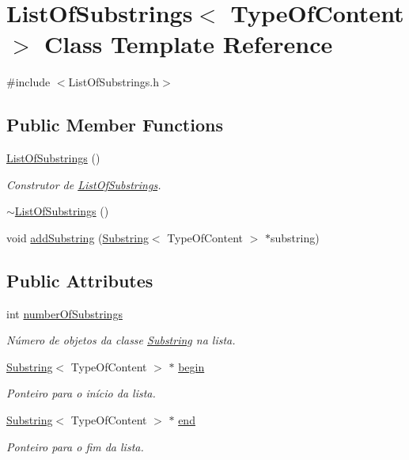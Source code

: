 \hypertarget{classListOfSubstrings}{\section{List\+Of\+Substrings$<$ Type\+Of\+Content $>$ Class Template Reference}
\label{classListOfSubstrings}
}


{\ttfamily \#include $<$List\+Of\+Substrings.\+h$>$}

\subsection*{Public Member Functions}
\begin{DoxyCompactItemize}
\item 
\hyperlink{classListOfSubstrings_ab8280100b0f6224eb4d36fc448d8eeb8}{List\+Of\+Substrings} ()
\begin{DoxyCompactList}\small\item\em Construtor de \hyperlink{classListOfSubstrings}{List\+Of\+Substrings}. \end{DoxyCompactList}\item 
\hyperlink{classListOfSubstrings_ae5aa0c336f8f5fab58a8d239cc5ab9d9}{$\sim$\+List\+Of\+Substrings} ()
\item 
void \hyperlink{classListOfSubstrings_a480372956993999a6e42e104cf264e32}{add\+Substring} (\hyperlink{classSubstring}{Substring}$<$ Type\+Of\+Content $>$ $\ast$substring)
\end{DoxyCompactItemize}
\subsection*{Public Attributes}
\begin{DoxyCompactItemize}
\item 
int \hyperlink{classListOfSubstrings_afbd8ea432d107cd2f1285c9fe5dd9b96}{number\+Of\+Substrings}
\begin{DoxyCompactList}\small\item\em Número de objetos da classe \hyperlink{classSubstring}{Substring} na lista. \end{DoxyCompactList}\item 
\hyperlink{classSubstring}{Substring}$<$ Type\+Of\+Content $>$ $\ast$ \hyperlink{classListOfSubstrings_aca3c37e86411bf80050bece7a1ec0df0}{begin}
\begin{DoxyCompactList}\small\item\em Ponteiro para o início da lista. \end{DoxyCompactList}\item 
\hyperlink{classSubstring}{Substring}$<$ Type\+Of\+Content $>$ $\ast$ \hyperlink{classListOfSubstrings_a4b4c8edcbdf74d6c6b0e21551e504b98}{end}
\begin{DoxyCompactList}\small\item\em Ponteiro para o fim da lista. \end{DoxyCompactList}\end{DoxyCompactItemize}



